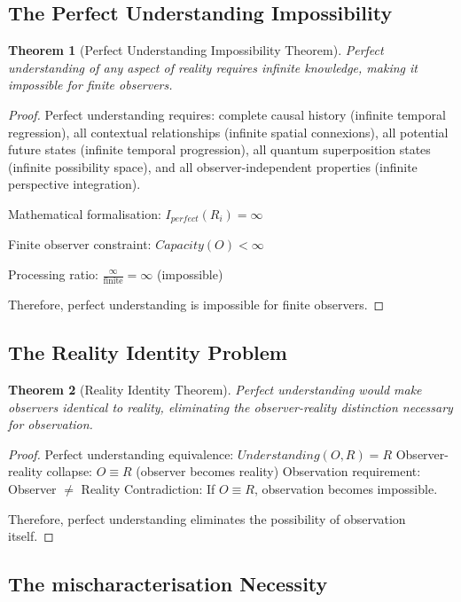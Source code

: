 \documentclass[12pt,a4paper]{article}
\newtheorem{theorem}{Theorem}[section]
\begin{document}
\subsection{The Perfect Understanding Impossibility}

\begin{theorem}[Perfect Understanding Impossibility Theorem]
Perfect understanding of any aspect of reality requires infinite knowledge, making it impossible for finite observers.
\end{theorem}

\begin{proof}
Perfect understanding requires: complete causal history (infinite temporal regression), all contextual relationships (infinite spatial connexions), all potential future states (infinite temporal progression), all quantum superposition states (infinite possibility space), and all observer-independent properties (infinite perspective integration).

Mathematical formalisation: $I_{perfect}(R_i) = \infty$

Finite observer constraint: $Capacity(O) < \infty$

Processing ratio: $\frac{\infty}{\text{finite}} = \infty$ (impossible)

Therefore, perfect understanding is impossible for finite observers.
\end{proof}

\subsection{The Reality Identity Problem}

\begin{theorem}[Reality Identity Theorem]
Perfect understanding would make observers identical to reality, eliminating the observer-reality distinction necessary for observation.
\end{theorem}

\begin{proof}
Perfect understanding equivalence: $Understanding(O,R) = R$
Observer-reality collapse: $O \equiv R$ (observer becomes reality)
Observation requirement: Observer $\neq$ Reality
Contradiction: If $O \equiv R$, observation becomes impossible.

Therefore, perfect understanding eliminates the possibility of observation itself.
\end{proof}

\subsection{The mischaracterisation Necessity}
\end{document}
